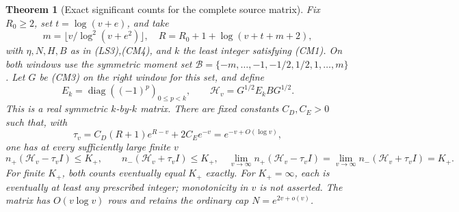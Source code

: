 \documentclass[11pt]{article}
\newtheorem{theorem}{Theorem}
\theoremstyle{remark}\newtheorem{remark}[theorem]{Remark}
\begin{document}
\begin{theorem}[Exact significant counts for the complete source matrix]
\label{thm:cofinal-real-source-signature}
Fix \(R_0\ge2\), set \(t=\log(v+e)\), and take
\[
 m=\lfloor v/\log^2(v+e^2)\rfloor,\quad
 R=R_0+1+\log(v+t+m+2),                             \tag{CS1}
\]
with \(\eta,N,H,B\) as in (LS3),(CM4), and \(k\) the least integer
satisfying (CM1).
On both windows use the symmetric moment set
\(\mathcal B=\{-m,\ldots,-1,-1/2,1/2,1,\ldots,m\}\).
Let \(G\) be (CM3) on the right window for this set, and define
\[
 E_k=\operatorname{diag}((-1)^p)_{0\le p<k},\qquad
                 \mathcal H_v=G^{1/2}E_kBG^{1/2}.     \tag{CS2}
\]
This is a real symmetric \(k\)-by-\(k\) matrix. There are
fixed constants \(C_D,C_E>0\) such that, with
\[
 \tau_v=C_D(R+1)e^{R-v}+2C_Ee^{-v}
                       =e^{-v+O(\log v)},            \tag{CS3}
\]
one has at every sufficiently large finite \(v\)
\[
 n_+(\mathcal H_v-\tau_v I)\le K_+,\qquad
 n_-(\mathcal H_v+\tau_v I)\le K_+,
 \quad
 \lim_{v\to\infty}n_+(\mathcal H_v-\tau_v I)
  =\lim_{v\to\infty}n_-(\mathcal H_v+\tau_v I)=K_+.   \tag{CS4}
\]
For finite \(K_+\), both counts eventually equal \(K_+\) exactly.
For \(K_+=\infty\), each is eventually at least any prescribed
integer; monotonicity in \(v\) is not asserted.
The matrix has \(O(v\log v)\) rows and retains the ordinary cap
\(N=e^{2v+o(v)}\).
\end{theorem}
\end{document}
